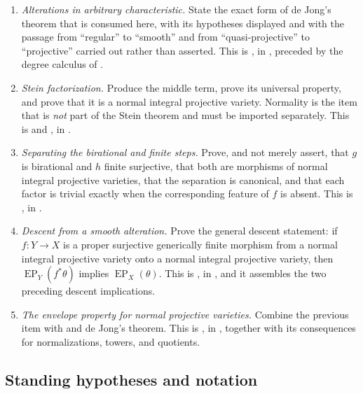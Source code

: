 \begin{enumerate}
\item\label{itm:ch42-task:alteration}
      \emph{Alterations in arbitrary characteristic.}  State the exact
      form of de Jong's theorem that is consumed here, with its hypotheses
      displayed and with the passage from ``regular'' to ``smooth'' and
      from ``quasi-projective'' to ``projective'' carried out rather than
      asserted.  This is , in
      , preceded by the degree calculus of
      .
\item\label{itm:ch42-task:stein}
      \emph{Stein factorization.}  Produce the middle term, prove its
      universal property, and prove that it is a normal integral projective
      variety.  Normality is the item that is \emph{not} part of the Stein
      theorem and must be imported separately.  This is
       and ,
      in .
\item\label{itm:ch42-task:separate}
      \emph{Separating the birational and finite steps.}  Prove, and not
      merely assert, that $g$ is birational and $h$ finite surjective,
      that both are morphisms of normal integral projective varieties, that
      the separation is canonical, and that each factor is trivial exactly
      when the corresponding feature of $f$ is absent.  This is
      , in .
\item\label{itm:ch42-task:descent}
      \emph{Descent from a smooth alteration.}  Prove the general descent
      statement: if $f:Y\to X$ is a proper surjective generically finite
      morphism from a normal integral projective variety onto a normal
      integral projective variety, then $\operatorname{EP}_Y(f^*\theta)$
      implies $\operatorname{EP}_X(\theta)$.  This is
      , in , and it
      assembles the two preceding descent implications.
\item\label{itm:ch42-task:normal}
      \emph{The envelope property for normal projective varieties.}
      Combine the previous item with  and de
      Jong's theorem.  This is , in
      , together with its consequences for
      normalizations, towers, and quotients.
\end{enumerate}

\subsection{Standing hypotheses and notation}
\label{sec:ch42-hypotheses}

